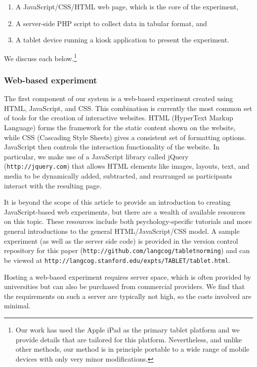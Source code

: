 \documentclass[man,noapacite]{apa2}
\begin{document}
\begin{enumerate}
\item A JavaScript/CSS/HTML web page, which is the core of the experiment, 
\item A server-side PHP script to collect data in tabular format, and
\item A tablet device running a kiosk application to present the experiment. 
\end{enumerate}

\noindent We discuss each below.\footnote{Our work has used the Apple iPad as the primary tablet platform and we provide details that are tailored for this platform. Nevertheless, and unlike other methods, our method is in principle portable to a wide range of mobile devices with only very minor modifications.}

\subsubsection{Web-based experiment}

The first component of our system is a web-based experiment created using HTML, JavaScript, and CSS. This combination is currently the most common set of tools for the creation of interactive websites. HTML (HyperText Markup Language) forms the framework for the static content shown on the website, while CSS (Cascading Style Sheets) gives a consistent set of formatting options. JavaScript then controls the interaction functionality of the website. In particular, we make use of a JavaScript library called jQuery (\texttt{http://jquery.com}) that allows HTML elements like images, layouts, text, and media to be dynamically added, subtracted, and rearranged as participants interact with the resulting page. 

It is beyond the scope of this article to provide an introduction to creating JavaScript-based web experiments, but there are a wealth of available resources on this topic. These resources include both psychology-specific tutorials and more general introductions to the general HTML/JavaScript/CSS model. A sample experiment (as well as the server side code) is provided in the version control repository for this paper (\texttt{http://github.com/langcog/tablet\textunderscore norming}) and can be viewed at \texttt{http://langcog.stanford.edu/expts/TABLET/tablet.html}.

Hosting a web-based experiment requires server space, which is often provided by universities but can also be purchased from commercial providers. We find that the requirements on such a server are typically not high, so the costs involved are minimal.
\end{document}
